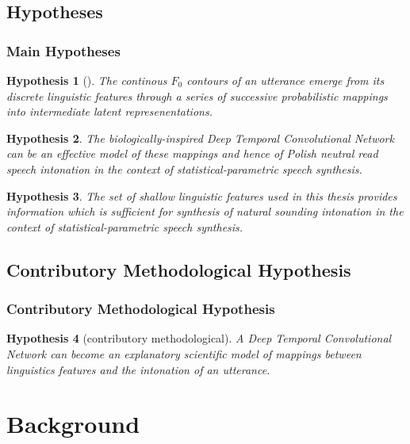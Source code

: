 \documentclass[a4paper,9pt]{beamer}
\theoremstyle{mytheoremstyle}
\newtheorem{hypothesis}{Hypothesis}
\begin{document}
\subsection{Hypotheses}
\begin{frame}
\frametitle{Main Hypotheses}
\begin{tcolorbox}
\begin{hypothesis}[] The continous $F_0$ contours of an utterance emerge from its discrete linguistic features through a series of successive probabilistic mappings into intermediate latent represenentations.
\end{hypothesis}
\begin{hypothesis}
The biologically-inspired Deep Temporal Convolutional Network can be an effective model of these mappings and hence of Polish neutral read speech intonation in the context of statistical-parametric speech synthesis. \label{secondary:a}
\end{hypothesis}
\begin{hypothesis}
The set of shallow linguistic features used in this thesis provides information which is sufficient for synthesis of natural sounding intonation in the context of statistical-parametric speech synthesis. \label{secondary:b}
\end{hypothesis}
\end{tcolorbox}
\end{frame}

\subsection{Contributory Methodological Hypothesis}
\begin{frame}
\frametitle{Contributory Methodological Hypothesis}
\begin{tcolorbox}
\begin{hypothesis}[contributory methodological]
\label{contributory}
A Deep Temporal Convolutional Network can become an explanatory scientific model of mappings between linguistics features and the intonation of an utterance.
\end{hypothesis}
\end{tcolorbox}
\end{frame}

\section{Background}
\end{document}
